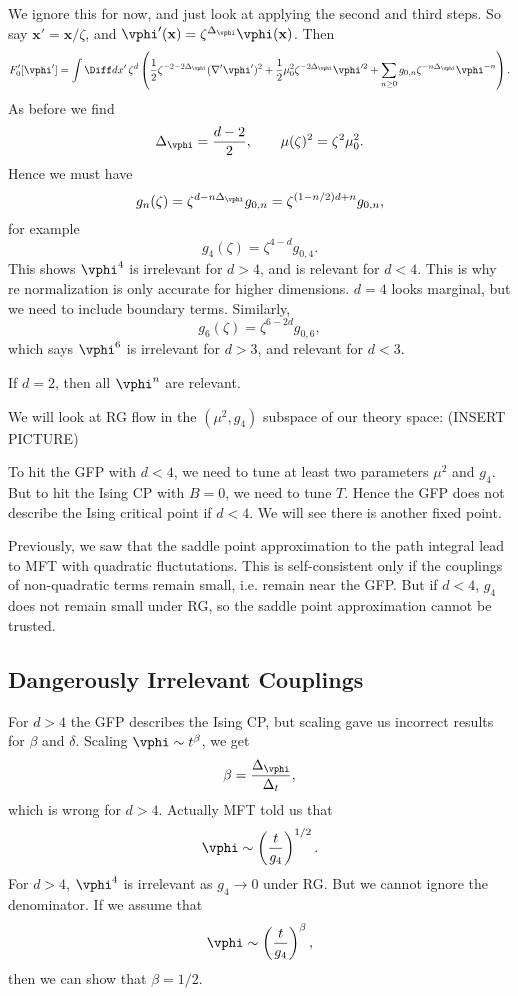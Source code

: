\documentclass[12pt]{article}
\begin{document}
We ignore this for now, and just look at applying the second and third steps. So say $\mathbf{x}' = \mathbf{x}/\zeta$, and $\vphi'(\mathbf{x}) = \zeta^{\Delta_{\vphi}} \vphi(\mathbf{x})$. Then
\[
	F_0'[\vphi'] = \int \Diff d x'\, \zeta^{d} \left( \frac{1}{2} \zeta^{-2 - 2 \Delta_{\vphi}}(\nabla' \vphi')^2 + \frac{1}{2} \mu_0^2 \zeta^{-2 \Delta_{\vphi}} \vphi'^2 + \sum_{n \geq 0} g_{0, n} \zeta^{-n \Delta_{\vphi}} \vphi^{-n} \right).
\]
As before we find
\[
\Delta_{\vphi} = \frac{d - 2}{2} , \qquad \mu(\zeta)^2 = \zeta^2 \mu_0^2.
\]
Hence we must have
\[
g_n(\zeta) = \zeta^{d - n \Delta_{\vphi}} g_{0, n} = \zeta^{(1 - n/2)d + n} g_{0, n},
\]
for example
\[
g_4(\zeta) = \zeta^{4 - d} g_{0, 4}.
\]
This shows $\vphi^{4}$ is irrelevant for $d > 4$, and is relevant for $d < 4$. This is why re normalization is only accurate for higher dimensions. $d = 4$ looks marginal, but we need to include boundary terms. Similarly,
\[
g_6(\zeta) = \zeta^{6 - 2d} g_{0, 6},
\]
which says $\vphi^{6}$ is irrelevant for $d > 3$, and relevant for $d < 3$.

If $d = 2$, then all $\vphi^{n}$ are relevant.

We will look at RG flow in the $(\mu^2, g_4)$ subspace of our theory space: (INSERT PICTURE)

To hit the GFP with $d < 4$, we need to tune at least two parameters $\mu^2$ and $g_4$. But to hit the Ising CP with $B = 0$, we need to tune $T$. Hence the GFP does not describe the Ising critical point if $d < 4$. We will see there is another fixed point.

Previously, we saw that the saddle point approximation to the path integral lead to MFT with quadratic fluctutations. This is self-consistent only if the couplings of non-quadratic terms remain small, i.e. remain near the GFP. But if $d < 4$, $g_4$ does not remain small under RG, so the saddle point approximation cannot be trusted.


\subsection{Dangerously Irrelevant Couplings}%
\label{sub:dics}

For $d > 4$ the GFP describes the Ising CP, but scaling gave us incorrect results for $\beta$ and $\delta$. Scaling $\vphi \sim t^{\beta}$, we get
\[
\beta = \frac{\Delta_{\vphi}}{\Delta_t},
\]
which is wrong for $d > 4$. Actually MFT told us that
\[
\vphi \sim \left( \frac{t}{g_4} \right)^{1/2}.
\]
For $d > 4$, $\vphi^{4}$ is irrelevant as $g_4 \to 0$ under RG. But we cannot ignore the denominator. If we assume that
\[
\vphi \sim \left( \frac{t}{g_4} \right)^{\beta},
\]
then we can show that $\beta = 1/2$.
\end{document}
